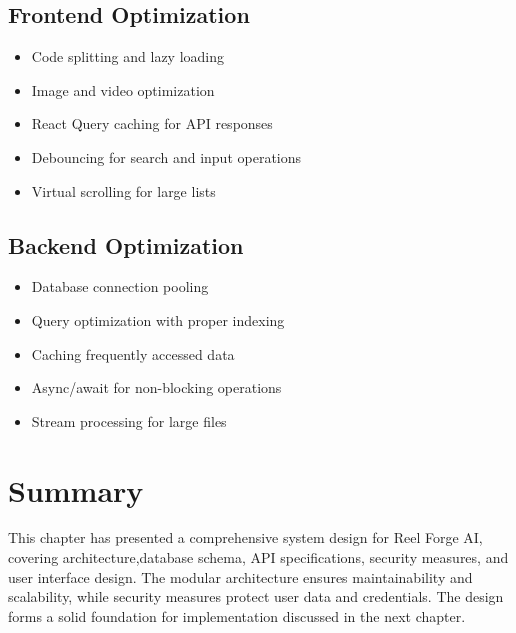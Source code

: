 \subsection{Frontend Optimization}

\begin{itemize}
    \item Code splitting and lazy loading
    \item Image and video optimization
    \item React Query caching for API responses
    \item Debouncing for search and input operations
    \item Virtual scrolling for large lists
\end{itemize}

\subsection{Backend Optimization}

\begin{itemize}
    \item Database connection pooling
    \item Query optimization with proper indexing
    \item Caching frequently accessed data
    \item Async/await for non-blocking operations
    \item Stream processing for large files
\end{itemize}

\section{Summary}

This chapter has presented a comprehensive system design for Reel Forge AI, covering architecture,database schema, API specifications, security measures, and user interface design. The modular architecture ensures maintainability and scalability, while security measures protect user data and credentials. The design forms a solid foundation for implementation discussed in the next chapter.
